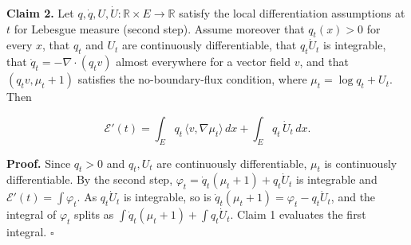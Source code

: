 \documentclass[11pt,a4paper]{report}
\begin{document}
\textbf{Claim 2.} Let \(q,\dot q,U,\dot U:\mathbb R\times E\to\mathbb R\) satisfy the local differentiation assumptions at \(t\) for Lebesgue measure (second step). Assume moreover that \(q_t(x)>0\) for every \(x\), that \(q_t\) and \(U_t\) are continuously differentiable, that \(q_t\dot U_t\) is integrable, that \(\dot q_t=-\nabla\cdot(q_tv)\) almost everywhere for a vector field \(v\), and that \((q_tv,\mu_t+1)\) satisfies the no-boundary-flux condition, where \(\mu_t=\log q_t+U_t\). Then


\[\mathcal E'(t)=\int_Eq_t\,\langle v,\nabla\mu_t\rangle\,dx+\int_Eq_t\,\dot U_t\,dx.\]


\textbf{Proof.} Since \(q_t>0\) and \(q_t,U_t\) are continuously differentiable, \(\mu_t\) is continuously differentiable. By the second step, \(\varphi_t=\dot q_t(\mu_t+1)+q_t\dot U_t\) is integrable and \(\mathcal E'(t)=\int\varphi_t\). As \(q_t\dot U_t\) is integrable, so is \(\dot q_t(\mu_t+1)=\varphi_t-q_t\dot U_t\), and the integral of \(\varphi_t\) splits as \(\int\dot q_t(\mu_t+1)+\int q_t\dot U_t\). Claim 1 evaluates the first integral. \(\square\)
\end{document}
